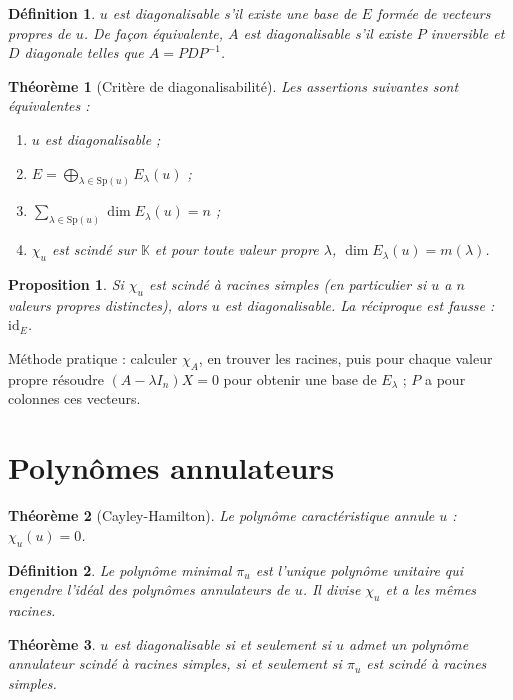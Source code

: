 \documentclass{article}
\newtheorem{theoreme}{Théorème}
\newtheorem{definition}{Définition}
\newtheorem{proposition}{Proposition}
\begin{document}
\begin{definition}
$u$ est diagonalisable s'il existe une base de $E$ formée de vecteurs propres de $u$.
De façon équivalente, $A$ est diagonalisable s'il existe $P$ inversible et $D$ diagonale
telles que $A = P D P^{-1}$.
\end{definition}

\begin{theoreme}[Critère de diagonalisabilité]
Les assertions suivantes sont équivalentes :
\begin{enumerate}
  \item $u$ est diagonalisable ;
  \item $E = \bigoplus_{\lambda \in \mathrm{Sp}(u)} E_\lambda(u)$ ;
  \item $\sum_{\lambda \in \mathrm{Sp}(u)} \dim E_\lambda(u) = n$ ;
  \item $\chi_u$ est scindé sur $\mathbb{K}$ et pour toute valeur propre $\lambda$,
        $\dim E_\lambda(u) = m(\lambda)$.
\end{enumerate}
\end{theoreme}

\begin{proposition}
Si $\chi_u$ est scindé à racines simples (en particulier si $u$ a $n$ valeurs propres
distinctes), alors $u$ est diagonalisable. La réciproque est fausse : $\mathrm{id}_E$.
\end{proposition}

Méthode pratique : calculer $\chi_A$, en trouver les racines, puis pour chaque valeur propre
résoudre $(A - \lambda I_n) X = 0$ pour obtenir une base de $E_\lambda$ ; $P$ a pour colonnes
ces vecteurs.

\section{Polynômes annulateurs}

\begin{theoreme}[Cayley-Hamilton]
Le polynôme caractéristique annule $u$ : $\chi_u(u) = 0$.
\end{theoreme}

\begin{definition}
Le polynôme minimal $\pi_u$ est l'unique polynôme unitaire qui engendre l'idéal des
polynômes annulateurs de $u$. Il divise $\chi_u$ et a les mêmes racines.
\end{definition}

\begin{theoreme}
$u$ est diagonalisable si et seulement si $u$ admet un polynôme annulateur scindé à racines
simples, si et seulement si $\pi_u$ est scindé à racines simples.
\end{theoreme}
\end{document}
